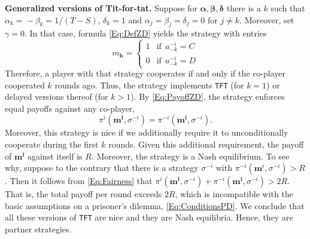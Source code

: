 \documentclass[9pt,twoside,lineno]{pnas-new}
\theoremstyle{plainCl1}
\theoremstyle{plainCl2}
\def\tft{\texttt{TFT}}
\begin{document}
\noindent
{\bf Generalized versions of Tit-for-tat.} 
Suppose for $\boldsymbol \alpha, \boldsymbol \beta, \boldsymbol \delta$ there is a $k$ such that $\alpha_k\!=\!-\beta_k\!=\!1/(T\!-\!S)$, $\delta_k\!=\!1$ and $\alpha_j\!=\!\beta_j\!=\!\delta_j\!=\!0$ for $j\!\neq\!k$. Moreover, set $\gamma\!=\!0$. In that case, formula
\eqref{Eq:DefZD} yields the strategy with entries
\begin{equation*}
m_\mathbf{h} = \left\{
\begin{array}{ll}
1	&\text{if}~~a^{-i}_{-k}=C\\[0.2cm]
0	&\text{if}~~a^{-i}_{-k}=D
\end{array}
\right.
\end{equation*}
Therefore, a player with that strategy cooperates if and only if the co-player cooperated $k$ rounds ago. 
Thus, the strategy implements \tft{} (for $k\!=\!1$) or delayed versions thereof (for $k\!>\!1$). 
By \eqref{Eq:PayoffZD}, the strategy enforces equal payoffs against any co-player, 
\begin{equation} \label{Eq:Fairness}
\pi^i(\mathbf{m^i},\sigma^{-i}) \!=\! \pi^{-i}(\mathbf{m^i},\sigma^{-i}).
\end{equation} 
Moreover, this strategy is nice if we additionally require it to unconditionally cooperate during the first $k$ rounds. 
Given this additional requirement, the payoff of $\mathbf{m^i}$ against itself is $R$. 
Moreover, the strategy is a Nash equilibrium. To see why, suppose to the contrary that there is a strategy $\sigma^{-i}$ with $\pi^{-i}(\mathbf{m}^i,\sigma^{-i}) \!>\! R$. Then it follows from \eqref{Eq:Fairness} that $\pi^i(\mathbf{m^i},\sigma^{-i}) \!+\! \pi^{-i}(\mathbf{m^i},\sigma^{-i})\!>\!2R$. That is, the total  payoff per round exceeds $2R$, which is incompatible with the basic assumptions on a prisoner's dilemma, \eqref{Eq:ConditionsPD}. We conclude that all these versions of \tft{} are nice and they are Nash equilibria. Hence, they are partner strategies.\\
\end{document}

